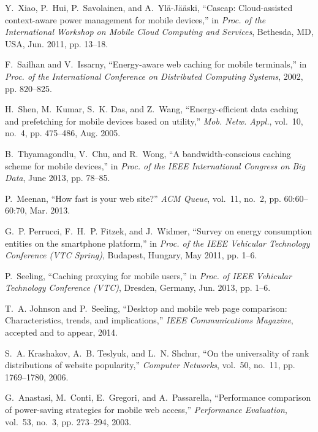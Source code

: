 \documentclass[letterpaper,conference]{IEEEtran}
\begin{document}
\begin{thebibliography}{10}
\BIBentryALTinterwordspacing
Y.~Xiao, P.~Hui, P.~Savolainen, and A.~Yl\"{a}-J\"{a}\"{a}ski, ``Cascap:
  Cloud-assisted context-aware power management for mobile devices,'' in
  \emph{Proc. of the International Workshop on Mobile Cloud
  Computing and Services}, Bethesda, MD, USA, Jun. 2011, pp. 13--18. 
\BIBentrySTDinterwordspacing

\BIBentryALTinterwordspacing
F.~Sailhan and V.~Issarny, ``Energy-aware web caching for mobile terminals,''
  in \emph{Proc. of the International Conference on Distributed Computing Systems}, 2002, pp. 820--825.
\BIBentrySTDinterwordspacing

\BIBentryALTinterwordspacing
H.~Shen, M.~Kumar, S.~K. Das, and Z.~Wang, ``Energy-efficient data caching and
  prefetching for mobile devices based on utility,'' \emph{Mob. Netw. Appl.},
  vol.~10, no.~4, pp. 475--486, Aug. 2005. 
\BIBentrySTDinterwordspacing

\BIBentryALTinterwordspacing
B.~Thyamagondlu, V.~Chu, and R.~Wong, ``A bandwidth-conscious caching scheme
  for mobile devices,'' in \emph{Proc. of the IEEE International Congress on Big Data}, June 2013, pp. 78--85.
\BIBentrySTDinterwordspacing

\BIBentryALTinterwordspacing
P.~Meenan, ``How fast is your web site?'' \emph{ACM Queue}, vol.~11, no.~2, pp.
  60:60--60:70, Mar. 2013. 
\BIBentrySTDinterwordspacing

\BIBentryALTinterwordspacing
G.~P. Perrucci, F.~H.~P. Fitzek, and J.~Widmer, ``Survey on energy consumption
  entities on the smartphone platform,'' in \emph{Proc. of the IEEE Vehicular Technology
  Conference (VTC Spring)}, Budapest, Hungary, May 2011, pp. 1--6.
\BIBentrySTDinterwordspacing

\BIBentryALTinterwordspacing
P.~Seeling, ``Caching proxying for mobile users,'' in \emph{Proc. of IEEE
  Vehicular Technology Conference (VTC)}, Dresden, Germany, Jun. 2013, pp. 1--6.
\BIBentrySTDinterwordspacing

\BIBentryALTinterwordspacing
T.~A. Johnson and P.~Seeling, ``Desktop and mobile web page comparison:
  Characteristics, trends, and implications,'' \emph{IEEE Communications
  Magazine}, accepted and to appear, 2014.
\BIBentrySTDinterwordspacing

\BIBentryALTinterwordspacing
S.~A. Krashakov, A.~B. Teslyuk, and L.~N. Shchur, ``On the universality of rank
  distributions of website popularity,'' \emph{Computer Networks}, vol.~50,
  no.~11, pp. 1769--1780, 2006. 
\BIBentrySTDinterwordspacing

G.~Anastasi, M.~Conti, E.~Gregori, and A.~Passarella, ``Performance comparison
  of power-saving strategies for mobile web access,'' \emph{Performance
  Evaluation}, vol.~53, no.~3, pp. 273--294, 2003.

\end{thebibliography}
\end{document}
